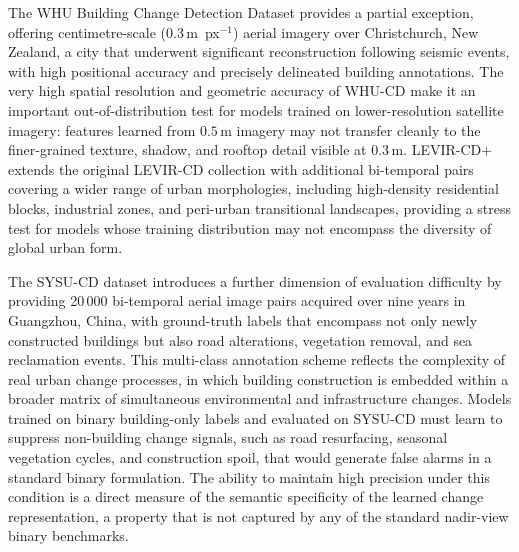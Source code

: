 The WHU Building Change Detection Dataset \cite{Ji2019WHU} provides a partial exception, offering centimetre-scale ($0.3\,\mathrm{m}$~px$^{-1}$) aerial imagery over Christchurch, New Zealand, a city that underwent significant reconstruction following seismic events, with high positional accuracy and precisely delineated building annotations. The very high spatial resolution and geometric accuracy of WHU-CD make it an important out-of-distribution test for models trained on lower-resolution satellite imagery: features learned from $0.5\,\mathrm{m}$ imagery may not transfer cleanly to the finer-grained texture, shadow, and rooftop detail visible at $0.3\,\mathrm{m}$. LEVIR-CD+ \cite{LevirCDPlus} extends the original LEVIR-CD collection with additional bi-temporal pairs covering a wider range of urban morphologies, including high-density residential blocks, industrial zones, and peri-urban transitional landscapes, providing a stress test for models whose training distribution may not encompass the diversity of global urban form.

The SYSU-CD dataset \cite{ShiSYSU2022} introduces a further dimension of evaluation difficulty by providing 20\,000 bi-temporal aerial image pairs acquired over nine years in Guangzhou, China, with ground-truth labels that encompass not only newly constructed buildings but also road alterations, vegetation removal, and sea reclamation events. This multi-class annotation scheme reflects the complexity of real urban change processes, in which building construction is embedded within a broader matrix of simultaneous environmental and infrastructure changes. Models trained on binary building-only labels and evaluated on SYSU-CD must learn to suppress non-building change signals, such as road resurfacing, seasonal vegetation cycles, and construction spoil, that would generate false alarms in a standard binary formulation. The ability to maintain high precision under this condition is a direct measure of the semantic specificity of the learned change representation, a property that is not captured by any of the standard nadir-view binary benchmarks.

